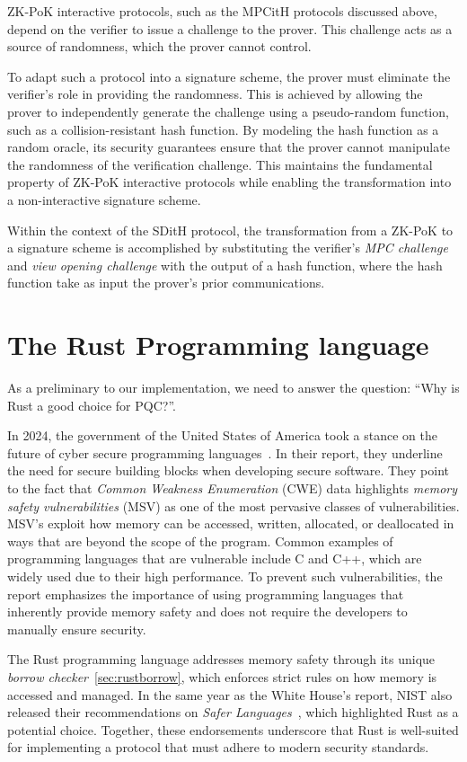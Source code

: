 \documentclass[11pt]{report}
\theoremstyle{definition}
\theoremstyle{plain}
\begin{document}
ZK-PoK interactive protocols, such as the MPCitH protocols discussed above, depend on the verifier to issue a challenge to the prover. This challenge acts as a source of randomness, which the prover cannot control.

To adapt such a protocol into a signature scheme, the prover must eliminate the verifier's role in providing the randomness. This is achieved by allowing the prover to independently generate the challenge using a pseudo-random function, such as a collision-resistant hash function. By modeling the hash function as a random oracle, its security guarantees ensure that the prover cannot manipulate the randomness of the verification challenge. This maintains the fundamental property of ZK-PoK interactive protocols while enabling the transformation into a non-interactive signature scheme.

Within the context of the SDitH protocol, the transformation from a ZK-PoK to a signature scheme is accomplished by substituting the verifier's \textit{MPC challenge} and \textit{view opening challenge} with the output of a hash function, where the hash function take as input the prover's prior communications.

\section{The Rust Programming language}\label{sec:rust}
As a preliminary to our implementation, we need to answer the question: ``Why is Rust a good choice for PQC?''.

In 2024, the government of the United States of America took a stance on the future of cyber secure programming languages~\cite{whitehouse2024memorysafe}. In their report, they underline the need for secure building blocks when developing secure software. They point to the fact that \textit{Common Weakness Enumeration} (CWE) data highlights \textit{memory safety vulnerabilities} (MSV) as one of the most pervasive classes of vulnerabilities. MSV's exploit how memory can be accessed, written, allocated, or deallocated in ways that are beyond the scope of the program. Common examples of programming languages that are vulnerable include C and C++, which are widely used due to their high performance. To prevent such vulnerabilities, the report emphasizes the importance of using programming languages that inherently provide memory safety and does not require the developers to manually ensure security.

The Rust programming language addresses memory safety through its unique \textit{borrow checker}~\autoref{sec:rustborrow}, which enforces strict rules on how memory is accessed and managed. In the same year as the White House's report, NIST also released their recommendations on \textit{Safer Languages}~\cite{nistsaferlanguages}, which highlighted Rust as a potential choice. Together, these endorsements underscore that Rust is well-suited for implementing a protocol that must adhere to modern security standards.
\end{document}
